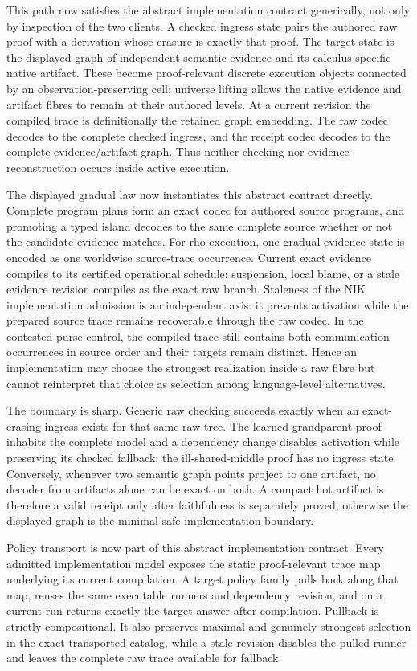 \documentclass[11pt]{article}
\begin{document}
This path now satisfies the abstract implementation contract generically, not
only by inspection of the two clients.  A checked ingress state pairs the
authored raw proof with a derivation whose erasure is exactly that proof.  The
target state is the displayed graph of independent semantic evidence and its
calculus-specific native artifact.  These become proof-relevant discrete
execution objects connected by an observation-preserving cell; universe lifting
allows the native evidence and artifact fibres to remain at their authored
levels.  At a current revision the compiled trace is definitionally the retained
graph embedding.  The raw codec decodes to the complete checked ingress, and the
receipt codec decodes to the complete evidence/artifact graph.  Thus neither
checking nor evidence reconstruction occurs inside active execution.

The displayed gradual law now instantiates this abstract contract directly.
Complete program plans form an exact codec for authored source programs, and
promoting a typed island decodes to the same complete source whether or not the
candidate evidence matches.  For rho execution, one gradual evidence state is
encoded as one worldwise source-trace occurrence.  Current exact evidence
compiles to its certified operational schedule; suspension, local blame, or a
stale evidence revision compiles as the exact raw branch.  Staleness of the NIK
implementation admission is an independent axis: it prevents activation while
the prepared source trace remains recoverable through the raw codec.  In the
contested-purse control, the compiled trace still contains both communication
occurrences in source order and their targets remain distinct.  Hence an
implementation may choose the strongest realization inside a raw fibre but
cannot reinterpret that choice as selection among language-level alternatives.

The boundary is sharp.  Generic raw checking succeeds exactly when an
exact-erasing ingress exists for that same raw tree.  The learned grandparent
proof inhabits the complete model and a dependency change disables activation
while preserving its checked fallback; the ill-shared-middle proof has no
ingress state.  Conversely, whenever two semantic graph points project to one
artifact, no decoder from artifacts alone can be exact on both.  A compact hot
artifact is therefore a valid receipt only after faithfulness is separately
proved; otherwise the displayed graph is the minimal safe implementation
boundary.

Policy transport is now part of this abstract implementation contract.  Every
admitted implementation model exposes the static proof-relevant trace map
underlying its current compilation.  A target policy family pulls back along
that map, reuses the same executable runners and dependency revision, and on a
current run returns exactly the target answer after compilation.  Pullback is
strictly compositional.  It also preserves maximal and genuinely strongest
selection in the exact transported catalog, while a stale revision disables
the pulled runner and leaves the complete raw trace available for fallback.
\end{document}
